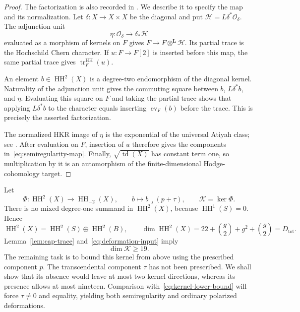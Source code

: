 \documentclass[11pt]{article}
\numberwithin{equation}{section}
\theoremstyle{definition}
\theoremstyle{remark}
\newcommand{\HH}{\operatorname{HH}}
\newcommand{\td}{\operatorname{td}}
\begin{document}
\begin{proof}
The factorization is also recorded in
\cite[Corollary~6.3.2 and Theorem~6.4.2]{Deformation:BF2008}.
We describe it to specify the map and its normalization.
Let $\delta:X\to X\times X$ be the diagonal and put
$\mathcal H=L\delta^*\mathcal O_\delta$. The adjunction unit
\[
 \eta:\mathcal O_\delta\longrightarrow\delta_*\mathcal H
\]
evaluated as a morphism of kernels on $F$ gives
$F\to F\otimes^{\mathbf L}\mathcal H$. Its partial trace is the
Hochschild Chern character. If $u:F\to F[2]$ is inserted before this
map, the same partial trace gives
$\operatorname{tr}^{\HH}_F(u)$.

An element $b\in\HH^2(X)$ is a degree-two endomorphism of the
diagonal kernel. Naturality of the adjunction unit gives the
commuting square between $b$, $L\delta^*b$, and $\eta$. Evaluating
this square on $F$ and taking the partial trace shows that applying
$L\delta^*b$ to the character equals inserting
$\operatorname{ev}_F(b)$ before the trace. This is precisely the
asserted factorization.

The normalized HKR image of $\eta$ is the exponential of the
universal Atiyah class; see
\cite[Proposition~4.4 and Theorem~4.5]{Deformation:Caldararu}.
After evaluation on $F$, insertion of $u$ therefore gives the
components in~\eqref{eq:semiregularity-map}. Finally,
$\sqrt{\td(X)}$ has constant term one, so multiplication by it is
an automorphism of the finite-dimensional Hodge-cohomology target.
\end{proof}

Let
\[
 \Phi:\HH^2(X)\longrightarrow\HH_{-2}(X),\qquad
 b\longmapsto b\mathbin{\lrcorner}(p+\tau),\qquad
 \mathcal K=\ker\Phi.
\]
There is no mixed degree-one summand in $\HH^2(X)$, because
$\HH^1(S)=0$. Hence
\begin{equation}\label{eq:HH-domain-dimension}
 \HH^2(X)=\HH^2(S)\oplus\HH^2(B),\qquad
 \dim\HH^2(X)=22+\binom g2+g^2+\binom g2=D_{\mathrm{tot}}.
\end{equation}
Lemma~\ref{lem:cap-trace} and~\eqref{eq:deformation-input} imply
\begin{equation}\label{eq:kernel-lower-bound}
 \dim \mathcal K\ge19.
\end{equation}
The remaining task is to bound this kernel from above using the
prescribed component $p$. The transcendental component $\tau$ has
not been prescribed. We shall show that its absence would leave
at most two kernel directions, whereas its presence allows at
most nineteen. Comparison with~\eqref{eq:kernel-lower-bound} will
force $\tau\ne0$ and equality, yielding both semiregularity and
ordinary polarized deformations.
\end{document}
